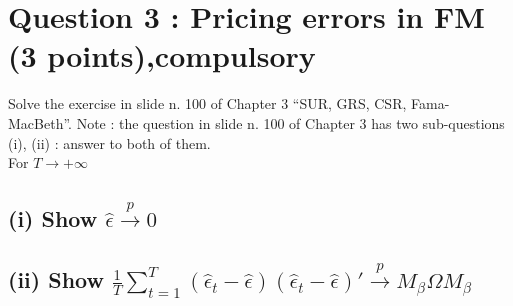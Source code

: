 \documentclass[]{article}
\title{}
\author{}
\begin{document}
\maketitle

\section*{Question 3 : Pricing errors in FM (3 points),compulsory}
Solve the exercise in slide n. 100 of Chapter 3 “SUR, GRS, CSR, Fama-MacBeth”. Note : the question in slide n. 100 of Chapter 3 has two sub-questions (i), (ii) : answer to both of them.\\

For $T \rightarrow + \infty$

\subsection*{(i) Show $\hat{\epsilon} \xrightarrow{p} 0$}

\subsection*{(ii) Show $\frac{1}{T} \sum_{t=1}^{T} (\hat{\epsilon}_t - \hat{\epsilon})(\hat{\epsilon}_t - \hat{\epsilon})' \xrightarrow{p} M_{\beta} \Omega M_{\beta}$}
\end{document}
